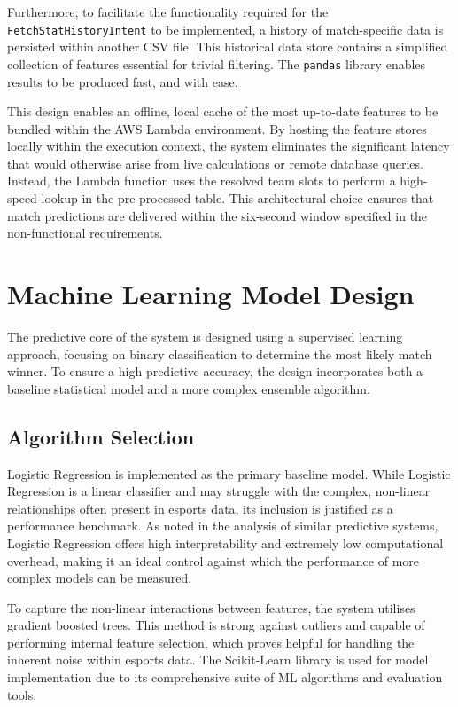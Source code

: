 Furthermore, to facilitate the functionality required for the \texttt{FetchStatHistoryIntent} to be implemented, a history of match-specific data is persisted within another CSV file. This historical data store contains a simplified collection of features essential for trivial filtering. The \texttt{pandas} library enables results to be produced fast, and with ease.

This design enables an offline, local cache of the most up-to-date features to be bundled within the AWS Lambda environment. By hosting the feature stores locally within the execution context, the system eliminates the significant latency that would otherwise arise from live calculations or remote database queries. Instead, the Lambda function uses the resolved team \glspl{slot} to perform a high-speed lookup in the pre-processed table. This architectural choice ensures that match predictions are delivered within the six-second window specified in the non-functional requirements.

\section{Machine Learning Model Design}
The predictive core of the system is designed using a supervised learning approach, focusing on binary classification to determine the most likely match winner. To ensure a high predictive accuracy, the design incorporates both a baseline statistical model and a more complex ensemble algorithm.

\subsection{Algorithm Selection}
Logistic Regression is implemented as the primary baseline model. While Logistic Regression is a linear classifier and may struggle with the complex, non-linear relationships often present in esports data, its inclusion is justified as a performance benchmark. As noted in the analysis of similar predictive systems, Logistic Regression offers high interpretability and extremely low computational overhead, making it an ideal control against which the performance of more complex models can be measured.

To capture the non-linear interactions between features, the system utilises gradient boosted trees. This method is strong against outliers and capable of performing internal feature selection, which proves helpful for handling the inherent noise within esports data. The Scikit-Learn library is used for model implementation due to its comprehensive suite of ML algorithms and evaluation tools.

